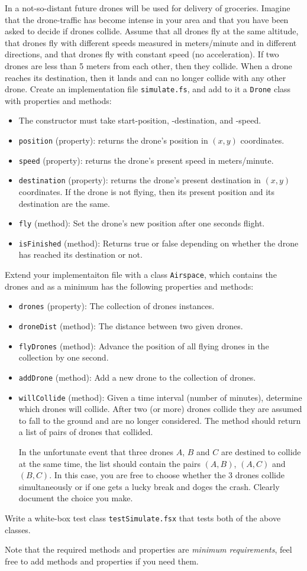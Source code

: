 In a not-so-distant future drones will be used for delivery of
groceries. Imagine that the drone-traffic has become intense in your
area and that you have been asked to decide if drones collide. Assume
that all drones fly at the same altitude, that drones fly with
different speeds measured in meters/minute and in different
directions, and that drones fly with constant speed (no
acceleration). If two drones are less than 5 meters from each other,
then they collide. When a drone reaches its destination, then it lands
and can no longer collide with any other drone. Create an implementation
file \lstinline{simulate.fs}, and add to it a \lstinline{Drone} class
with properties and methods:

\begin{itemize}
\item The constructor must take start-position, -destination, and -speed.
\item \lstinline{position} (property): returns the drone's position in $(x, y)$ coordinates.
\item \lstinline{speed} (property): returns the drone's present speed in meters/minute.
\item \lstinline{destination} (property): returns the drone's present destination in $(x, y)$ coordinates. If the drone is not flying, then its present position and its destination are the same.
\item \lstinline{fly} (method): Set the drone's new position after one
  seconds flight.
\item \lstinline{isFinished} (method): Returns true or false depending on whether the drone has reached its destination or not.
\end{itemize}

Extend your implementaiton file with a class \lstinline{Airspace}, which contains the drones and as a minimum has the following properties and methods:
\begin{itemize}
\item \lstinline{drones} (property): The collection of drones instances.
\item \lstinline{droneDist} (method): The distance between two given drones.
\item \lstinline{flyDrones} (method): Advance the position of all
  flying drones in the collection by one second.
\item \lstinline{addDrone} (method): Add a new drone to the collection of drones.
\item \lstinline{willCollide} (method): Given a time interval (number
  of minutes),
  determine which drones will collide. After two (or more) drones
  collide they are assumed to fall to the ground and are no longer
  considered. The method should return a list of pairs of drones that
  collided.

  In the unfortunate event that three drones $A$, $B$ and $C$ are
  destined to collide at the same time, the list should contain the
  pairs $(A,B)$, $(A, C)$ and $(B,C)$. In this case, you are free to
  choose whether the 3 drones collide simultaneously or if one gets a
  lucky break and doges the crash. Clearly document the choice you
  make.
\end{itemize}

Write a white-box test class \lstinline{testSimulate.fsx} that tests
both of the above classes.

Note that the required methods and properties are \emph{minimum
  requirements}, feel free to add methods and properties if you need them.